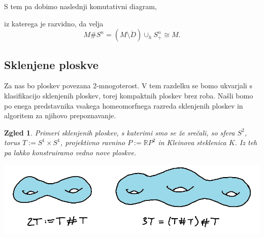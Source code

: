 \documentclass[10pt, a4paper]{article}
\newtheorem{zgled}[izr]{Zgled}
\newcommand{\R}{\mathbb {R}}
\begin{document}
  \begin{center}
  \end{center}   
S tem pa dobimo naslednji komutativni diagram,
  \begin{center}
  \end{center}   
iz katerega je razvidno, da velja 
$$M \# S^n = (M \setminus \mathring{D}) \cup_h S_+^n \cong M.$$

\subsection{Sklenjene ploskve}

Za nas bo ploskev povezana 2-mnogoterost.
V tem razdelku se bomo ukvarjali s klasifikacijo sklenjenih ploskev,
torej kompaktnih ploskev brez roba.
Našli bomo po enega predstavnika vsakega homeomorfnega razreda 
sklenjenih ploskev in algoritem za njihovo prepoznavanje.

\begin{zgled}
  Primeri sklenjenih ploskev, s katerimi smo se že srečali,
  so sfera $S^2$, torus $T := S^1 \times S^1$, projektivno ravnino 
  $P := \R P^2$ in Kleinova steklenica $K$.
  Iz teh pa lahko konstruiramo vedno nove ploskve.
  \begin{center}
    \includegraphics[scale=0.7]{zgled13.png}
  \end{center}
\end{zgled}
\end{document}
